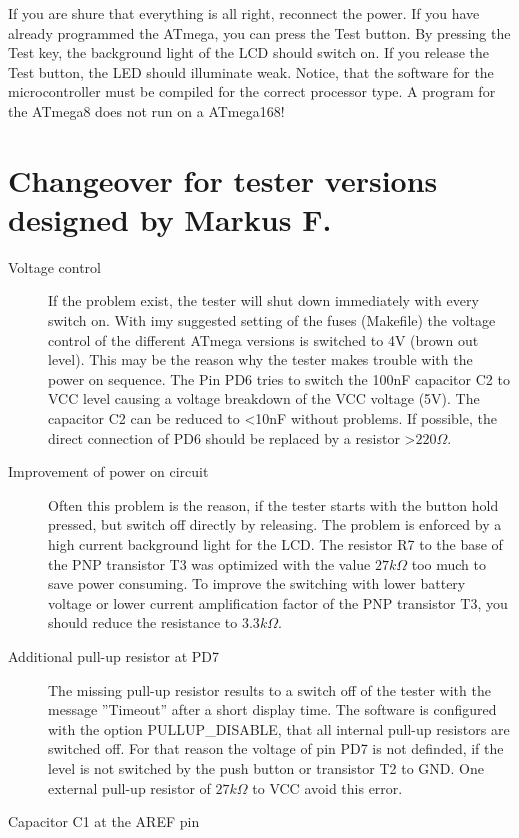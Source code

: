 If you are shure that everything is all right, reconnect the power. 
If you have already programmed the ATmega, you can press the Test button.
By pressing the Test key, the background light of the LCD should switch on.
If you release the Test button, the LED should illuminate weak.
Notice, that the software for the microcontroller must be compiled for the
correct processor type. A program for the ATmega8 does not run on a ATmega168!

\section{Changeover for tester versions designed by Markus F.}
\label{sec:change_markus}
\begin{description}

\item[Voltage control]
If the problem exist, the tester will shut down immediately with every switch on.
With imy suggested setting of the fuses (Makefile) the voltage control of the different
ATmega versions is switched to 4V (brown out level).
This may be the reason why the tester makes trouble with the power on sequence.
The Pin PD6 tries to switch the 100nF capacitor C2 to VCC level causing a voltage
breakdown of the VCC voltage (5V).
The capacitor C2 can be reduced to \textless 10nF without problems.
If possible, the direct connection of PD6 should be replaced by a resistor \textgreater \(220 \Omega\).
\item[Improvement of power on circuit]
Often this problem is the reason, if the tester starts with the button hold pressed, but switch off
directly by releasing. The problem is enforced by a high current background light for the LCD.
The resistor R7 to the base of the PNP transistor T3 was optimized with the value \(27k \Omega\) 
too much to save power consuming.
To improve the switching with lower battery voltage or lower current amplification factor of
the PNP transistor T3, you should reduce the resistance to \(3.3k \Omega\).
\item[Additional pull-up resistor at PD7]
The missing pull-up resistor results to a switch off of the tester with the message ''Timeout''
after a short display time.
The software is configured with the option PULLUP\_DISABLE, that all internal pull-up
resistors are switched off. For that reason the voltage of pin PD7 is not definded,
if the level is not switched by the push button or transistor T2 to GND.
One external pull-up resistor of \(27k \Omega\) to VCC avoid this error.
\item[Capacitor C1 at the AREF pin]

\end{description}
